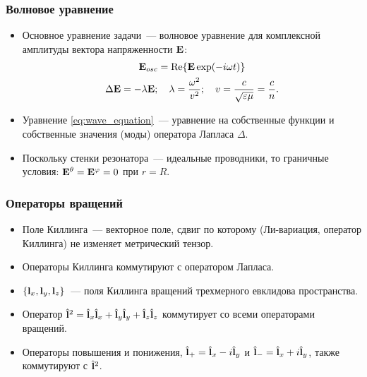 \documentclass[compress]{beamer}
\begin{document}
    \begin{frame}\frametitle{Волновое уравнение}

        \begin{itemize}\justifying

            \item Основное уравнение задачи~--- волновое уравнение для комплексной амплитуды вектора напряженности $\mathbf{E}$:
            \begin{gather}
                \vb{E}_{osc} = \Re{\vb{E} \exp(-i \omega t)} \nonumber \\
                \Delta \mathbf{E} = - \lambda \mathbf{E} ; \quad
                    \lambda = \frac{\omega^2}{v^2} ; \quad
                    v = \frac{c}{\sqrt{\varepsilon\mu}} = \frac{c}{n} \label{eq:wave_equation}.
            \end{gather}

            \item Уравнение \autoref{eq:wave_equation}~--- уравнение на собственные функции и собственные значения (моды) оператора Лапласа $\Delta$.

            \item Поскольку стенки резонатора~--- идеальные проводники, то граничные условия: $\vb{E}^\theta = \vb{E}^\varphi = 0$ при $r = R$.

        \end{itemize}

    \end{frame}


    \begin{frame}\frametitle{Операторы вращений}

        \begin{itemize}\justifying

            \item Поле Киллинга~--- векторное поле, сдвиг по которому (Ли-вариация, оператор Киллинга) не изменяет метрический тензор.

            \item Операторы Киллинга коммутируют с оператором Лапласа.

            \item $\qty{ \mathbf{l}_x, \mathbf{l}_y, \mathbf{l}_z }$~--- поля Киллинга вращений трехмерного евклидова пространства.

            \item Оператор $\hat{\mathbf{l}}^2 = \hat{\mathbf{l}}_x \hat{\mathbf{l}}_x + \hat{\mathbf{l}}_y \hat{\mathbf{l}}_y + \hat{\mathbf{l}}_z \hat{\mathbf{l}}_z$ коммутирует со всеми операторами вращений.

            \item Операторы повышения и понижения, $\hat{\mathbf{l}}_{+} = \hat{\mathbf{l}}_x - i\hat{\mathbf{l}}_y$ и $\hat{\mathbf{l}}_{-} = \hat{\mathbf{l}}_x + i\hat{\mathbf{l}}_y$, также коммутируют с $\hat{\mathbf{l}}^2$.

        \end{itemize}

    \end{frame}
\end{document}
